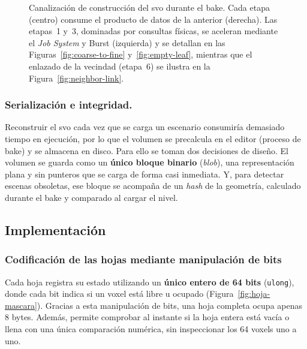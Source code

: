 \begin{figure}[htp]
  \caption[Canalización de construcción del \acrshort{svo}.]
  {Canalización de construcción del \acrshort{svo} durante el \gls{bake}.
  Cada etapa (centro) consume el producto de datos de la anterior (derecha).
  Las etapas~1 y~3, dominadas por consultas físicas, se aceleran mediante el \textit{Job System} y Burst (izquierda) y se detallan en las Figuras~\ref{fig:coarse-to-fine} y~\ref{fig:empty-leaf}, mientras que el enlazado de la vecindad (etapa~6) se ilustra en la Figura~\ref{fig:neighbor-link}.}
  \label{fig:build-pipeline}
\end{figure}

\subsubsection{Serialización e integridad.}

Reconstruir el \acrshort{svo} cada vez que se carga un escenario consumiría demasiado tiempo en ejecución, por lo que el volumen se precalcula en el editor (proceso de \gls{bake}) y se almacena en disco.
Para ello se toman dos decisiones de diseño.
El volumen se guarda como un \textbf{único bloque binario} (\textit{blob}), una representación plana y sin punteros que se carga de forma casi inmediata.
Y, para detectar escenas obsoletas, ese bloque se acompaña de un \textit{hash} de la geometría, calculado durante el \gls{bake} y comparado al cargar el nivel.

\subsection{Implementación}

\subsubsection{Codificación de las hojas mediante manipulación de bits}

Cada hoja registra su estado utilizando un \textbf{único entero de 64 bits} (\texttt{ulong}), donde cada bit indica si un \gls{voxel} está libre u ocupado (Figura~\ref{fig:hoja-mascara}).
Gracias a esta manipulación de bits, una hoja completa ocupa apenas 8 bytes.
Además, permite comprobar al instante si la hoja entera está vacía o llena con una única comparación numérica, sin inspeccionar los 64 \glspl{voxel} uno a uno.

